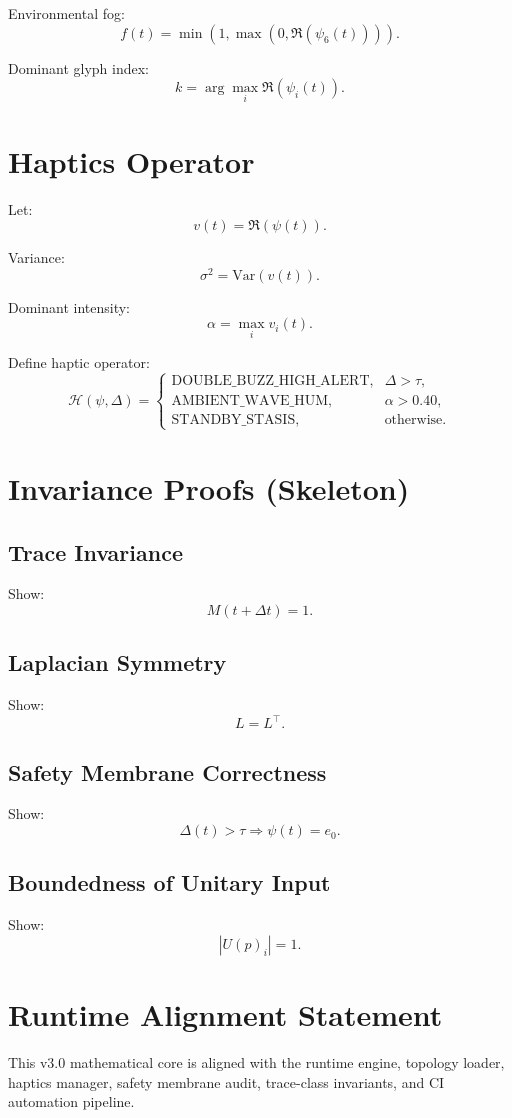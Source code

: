 \documentclass[12pt]{article}
\begin{document}
Environmental fog:
\[
f(t) = \min(1, \max(0, \Re(\psi_6(t)))).
\]

Dominant glyph index:
\[
k = \arg\max_i \Re(\psi_i(t)).
\]

\section{Haptics Operator}

Let:
\[
v(t) = \Re(\psi(t)).
\]

Variance:
\[
\sigma^2 = \mathrm{Var}(v(t)).
\]

Dominant intensity:
\[
\alpha = \max_i v_i(t).
\]

Define haptic operator:
\[
\mathcal{H}(\psi, \Delta) =
\begin{cases}
\text{DOUBLE\_BUZZ\_HIGH\_ALERT}, & \Delta > \tau, \\
\text{AMBIENT\_WAVE\_HUM}, & \alpha > 0.40, \\
\text{STANDBY\_STASIS}, & \text{otherwise}.
\end{cases}
\]

\section{Invariance Proofs (Skeleton)}

\subsection{Trace Invariance}
Show:
\[
M(t + \Delta t) = 1.
\]

\subsection{Laplacian Symmetry}
Show:
\[
L = L^\top.
\]

\subsection{Safety Membrane Correctness}
Show:
\[
\Delta(t) > \tau \Rightarrow \psi(t) = e_0.
\]

\subsection{Boundedness of Unitary Input}
Show:
\[
|U(p)_i| = 1.
\]

\section{Runtime Alignment Statement}

This v3.0 mathematical core is aligned with the runtime engine, topology loader,
haptics manager, safety membrane audit, trace-class invariants, and CI automation pipeline.
\end{document}
